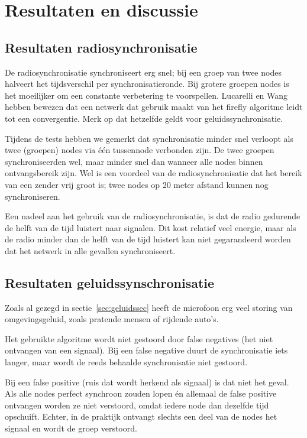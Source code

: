 \documentclass[a4paper,10pt]{article}
\begin{document}
\section{Resultaten en discussie}\label{sec:resultaten}
\subsection{Resultaten radiosynchronisatie}
De radiosynchronisatie synchroniseert erg snel; bij een groep van twee nodes halveert het tijdsverschil per synchronisatieronde. Bij grotere groepen nodes is het moeilijker om een constante verbetering te voorspellen. Lucarelli en Wang\cite{lucarelli2004decentralized} hebben bewezen dat een netwerk dat gebruik maakt van het firefly algoritme leidt tot een convergentie. Merk op dat hetzelfde geldt voor geluidssynchronisatie.

Tijdens de tests hebben we gemerkt dat synchronisatie minder snel verloopt als twee (groepen) nodes via \'e\'en tussennode verbonden zijn. De twee groepen synchroniseerden wel, maar minder snel dan wanneer alle nodes binnen ontvangsbereik zijn. Wel is een voordeel van de radiosynchronisatie dat het bereik van een zender vrij groot is; twee nodes op 20 meter afstand kunnen nog synchroniseren.

Een nadeel aan het gebruik van de radiosynchronisatie, is dat de radio gedurende de helft van de tijd luistert naar signalen. Dit kost relatief veel energie, maar als de radio minder dan de helft van de tijd luistert kan niet gegarandeerd worden dat het netwerk in alle gevallen synchroniseert.

\subsection{Resultaten geluidssynschronisatie}
Zoals al gezegd in sectie~\ref{sec:geluidssec} heeft de microfoon erg veel storing van omgevingsgeluid, zoals pratende mensen of rijdende auto's.

Het gebruikte algoritme wordt niet gestoord door false negatives (het niet ontvangen van een signaal). Bij een false negative duurt de synchronisatie iets langer, maar wordt de reeds behaalde synchronisatie niet gestoord.

Bij een false positive (ruis dat wordt herkend als signaal) is dat niet het geval. Als alle nodes perfect synchroon zouden lopen \'en allemaal de false positive ontvangen worden ze niet verstoord, omdat iedere node dan dezelfde tijd opschuift. Echter, in de praktijk ontvangt slechts een deel van de nodes het signaal en wordt de groep verstoord.
\end{document}
